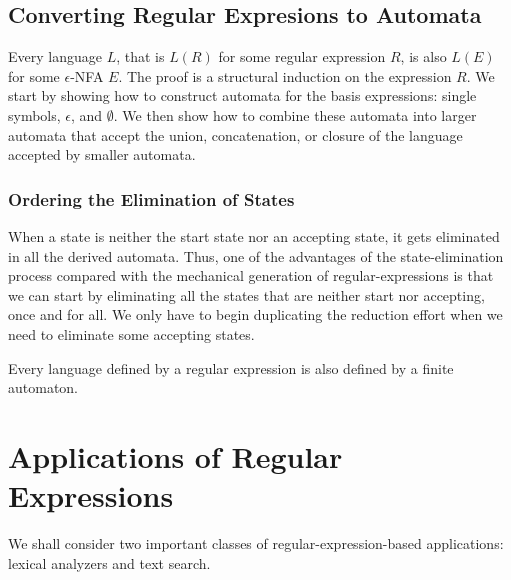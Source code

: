 \documentclass[]{article}
\begin{document}
  \subsection*{Converting Regular Expresions to Automata}
    Every language $L$, that is $L(R)$ for some regular expression $R$, is also
    $L(E)$ for some $\epsilon$-NFA $E$. The proof is a structural induction on
    the expression $R$. We start by showing how to construct automata for the
    basis expressions: single symbols, $\epsilon$, and $\emptyset$. We then show
    how to combine these automata into larger automata that accept the union,
    concatenation, or closure of the language accepted by smaller automata.

    \subsubsection*{Ordering the Elimination of States}
      When a state is neither the start state nor an accepting state, it gets
      eliminated in all the derived automata. Thus, one of the advantages of the
      state-elimination process compared with the mechanical generation of
      regular-expressions is that we can start by eliminating all the states
      that are neither start nor accepting, once and for all. We only have to
      begin duplicating the reduction effort when we need to eliminate some
      accepting states.

    \begin{thm}
      Every language defined by a regular expression is also defined by a finite
      automaton.
    \end{thm}

\section*{Applications of Regular Expressions}
  We shall consider two important classes of regular-expression-based
  applications: lexical analyzers and text search.
\end{document}
